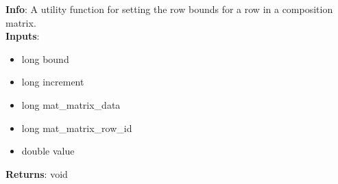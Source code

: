 \textbf{Info}: A utility function for setting the row bounds for a row in a
composition matrix.\\

\noindent \textbf{Inputs}:
\begin{itemize}
\item{long bound}
\item{long increment}
\item{long mat\_matrix\_data}
\item{long mat\_matrix\_row\_id}
\item{double value}
\end{itemize}

\noindent \textbf{Returns}: void
